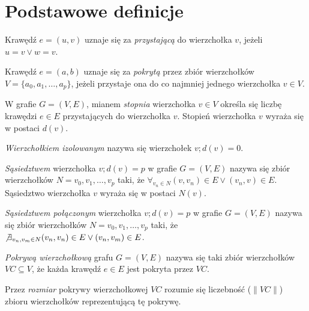 \section{Podstawowe definicje}\label{Section_Definicje}

\begin{definition}
  Krawędź $e=(u,v)$ uznaje się za \emph{przystającą} do wierzchołka $v$,
  jeżeli $u=v \lor w=v$.
\end{definition}

\begin{definition}
  Krawędź $e=(a,b)$ uznaje się za \emph{pokrytą} przez zbiór wierzchołków \\
  $V=\{a_0, a_1, \ldots, a_p\}$, jeżeli przystaje ona do co najmniej jednego
  wierzchołka $v \in V$.
\end{definition}

\begin{definition}
  W grafie $G=(V,E)$, mianem \emph{stopnia} wierzchołka $v \in V$ określa się 
  liczbę krawędzi $e \in E$ przystających do wierzchołka $v$.
  Stopień wierzchołka $v$ wyraża się w postaci $d(v)$.
\end{definition}

\begin{definition}
  \emph{Wierzchołkiem izolowanym} nazywa się wierzchołek $v; d(v)=0$.
\end{definition}

\begin{definition}
  \emph{Sąsiedztwem} wierzchołka $v; d(v)=p$ w grafie $G=(V,E)$ nazywa się zbiór 
  wierzchołków $N={v_0, v_1, \ldots, v_p}$ taki, że 
  $\forall_{v_n \in N}{(v,v_n) \in E \lor (v_n,v) \in E}$.
  Sąsiedztwo wierzchołka $v$ wyraża się w postaci $N(v)$.
\end{definition}

\begin{definition}
  \emph{Sąsiedztwem połączonym} wierzchołka $v; d(v)=p$ w grafie $G=(V,E)$ 
  nazywa się zbiór wierzchołków $N={v_0, v_1, \ldots, v_p}$ taki, że 
  $\not \exists_{v_n, v_m \in N}{(v_n,v_n) \in E \lor (v_n,v_m) \in E}$.
\end{definition}

\begin{definition}
  \emph{Pokrywą wierzchołkową} grafu $G=(V,E)$ nazywa się taki zbiór wierzchołków
  $VC \subseteq V$, że każda krawędź $e \in E$ jest pokryta przez $VC$.
\end{definition}

\begin{definition}
  Przez \emph{rozmiar} pokrywy wierzchołkowej $VC$ rozumie się liczebność ($\|VC\|$)
  zbioru wierzchołków reprezentującą tę pokrywę.
\end{definition}

